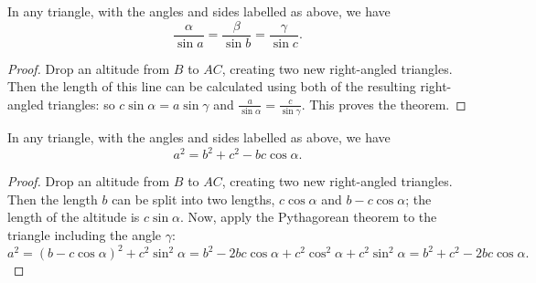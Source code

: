 \begin{thm}
  In any triangle, with the angles and sides labelled as above, we have
  \begin{displaymath}
    \frac{\alpha}{\sin a} = \frac{\beta}{\sin b} = \frac{\gamma}{\sin c}.
  \end{displaymath}
\end{thm}
\begin{proof}
  Drop an altitude from $ B $ to $ AC $, creating two new right-angled triangles. Then the length of this line can be calculated using both
  of the resulting right-angled triangles: so $ c \sin \alpha = a \sin \gamma $ and $ \frac{a}{\sin \alpha} = \frac{c}{\sin \gamma} $. This
  proves the theorem.
\end{proof}

\begin{thm}
  In any triangle, with the angles and sides labelled as above, we have
  \begin{displaymath}
    a^2 = b^2 + c^2 - bc\cos \alpha.
  \end{displaymath}
\end{thm}
\begin{proof}
  Drop an altitude from $ B $ to $ AC $, creating two new right-angled triangles. Then the length $ b $ can be split into two
  lengths, $ c \cos \alpha $ and $ b - c \cos \alpha $; the length of the altitude is $ c \sin \alpha $. Now, apply the Pythagorean
  theorem to the triangle including the angle $ \gamma $:
  \begin{displaymath}
    a^2 = (b - c \cos \alpha)^2 + c^2 \sin^2 \alpha = b^2 - 2bc \cos \alpha + c^2 \cos^2 \alpha + c^2 \sin^2 \alpha = b^2 + c^2 - 2bc \cos \alpha.
  \end{displaymath}
\end{proof}


